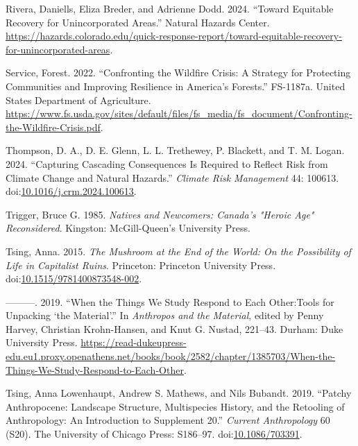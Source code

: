 \documentclass[
]{article}
\newlength{\cslhangindent}
\newenvironment{CSLReferences}[2] %
 {\begin{list}{}{%
  \setlength{\itemindent}{0pt}
  \setlength{\leftmargin}{0pt}
  \setlength{\parsep}{0pt}
  \ifodd #1
   \setlength{\leftmargin}{\cslhangindent}
   \setlength{\itemindent}{-1\cslhangindent}
  \fi
  \setlength{\itemsep}{#2\baselineskip}}}
 {\end{list}}
\begin{document}
\begin{CSLReferences}{1}{0}
Rivera, Daniells, Eliza Breder, and Adrienne Dodd. 2024. {``Toward {Equitable Recovery} for {Unincorporated Areas}.''} Natural Hazards Center. \url{https://hazards.colorado.edu/quick-response-report/toward-equitable-recovery-for-unincorporated-areas}.

Service, Forest. 2022. {``Confronting the {Wildfire Crisis}: {A Strategy} for {Protecting Communities} and {Improving Resilience} in {America}'s {Forests}.''} FS-1187a. United States Department of Agriculture. \url{https://www.fs.usda.gov/sites/default/files/fs_media/fs_document/Confronting-the-Wildfire-Crisis.pdf}.

Thompson, D. A., D. E. Glenn, L. L. Trethewey, P. Blackett, and T. M. Logan. 2024. {``Capturing Cascading Consequences Is Required to Reflect Risk from Climate Change and Natural Hazards.''} \emph{Climate Risk Management} 44: 100613. doi:\href{https://doi.org/10.1016/j.crm.2024.100613}{10.1016/j.crm.2024.100613}.

Trigger, Bruce G. 1985. \emph{Natives and Newcomers: {Canada}'s "{Heroic Age}" Reconsidered}. Kingston: McGill-Queen's University Press.

Tsing, Anna. 2015. \emph{The {Mushroom} at the {End} of the {World}: {On} the {Possibility} of {Life} in {Capitalist Ruins}}. Princeton: Princeton University Press. doi:\href{https://doi.org/10.1515/9781400873548-002}{10.1515/9781400873548-002}.

---------. 2019. {``When the {Things We Study Respond} to {Each Other}:{Tools} for {Unpacking} {`the {Material}'}.''} In \emph{Anthropos and the {Material}}, edited by Penny Harvey, Christian Krohn-Hansen, and Knut G. Nustad, 221--43. Durham: Duke University Press. \url{https://read-dukeupress-edu.eu1.proxy.openathens.net/books/book/2582/chapter/1385703/When-the-Things-We-Study-Respond-to-Each-Other}.

Tsing, Anna Lowenhaupt, Andrew S. Mathews, and Nils Bubandt. 2019. {``Patchy {Anthropocene}: {Landscape Structure}, {Multispecies History}, and the {Retooling} of {Anthropology}: {An Introduction} to {Supplement} 20.''} \emph{Current Anthropology} 60 (S20). The University of Chicago Press: S186--97. doi:\href{https://doi.org/10.1086/703391}{10.1086/703391}.


\end{CSLReferences}
\end{document}
